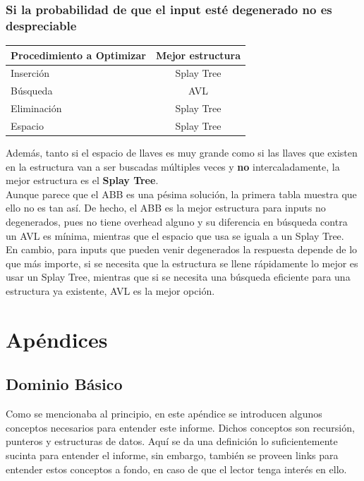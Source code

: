 \documentclass[12pt,letterpaper]{report}
\begin{document}
\subsubsection{Si la probabilidad de que el input esté degenerado no es despreciable}
\begin{center}
  \begin{tabular}{|l|c|}
    \hline
    Procedimiento a Optimizar & Mejor estructura \\ \hline
    Inserción & Splay Tree \\ \hline
    Búsqueda & AVL \\ \hline
    Eliminación & Splay Tree \\ \hline
    Espacio & Splay Tree \\ \hline
  \end{tabular}
\end{center}

Además, tanto si el espacio de llaves es muy grande como si las llaves que existen en la estructura van a ser buscadas múltiples veces y \textbf{no} intercaladamente, la mejor estructura es el \textbf{Splay Tree}.\\

Aunque parece que el ABB es una pésima solución, la primera tabla muestra que ello no es tan así. De hecho, el ABB es la mejor estructura para inputs no degenerados, pues no tiene overhead alguno y su diferencia en búsqueda contra un AVL es mínima, mientras que el espacio que usa se iguala a un Splay Tree.\\

En cambio, para inputs que pueden venir degenerados la respuesta depende de lo que más importe, si se necesita que la estructura se llene rápidamente lo mejor es usar un Splay Tree, mientras que si se necesita una búsqueda eficiente para una estructura ya existente, AVL es la mejor opción.


\newpage
\section{Apéndices}
\subsection{Dominio Básico}
\label{subsec:apen_dombasico}
Como se mencionaba al principio, en este apéndice se introducen algunos conceptos necesarios para entender este informe. Dichos conceptos son recursión, punteros y estructuras de datos. Aquí se da una definición lo suficientemente sucinta para entender el informe, sin embargo, también se proveen links para entender estos conceptos a fondo, en caso de que el lector tenga interés en ello.
\end{document}
